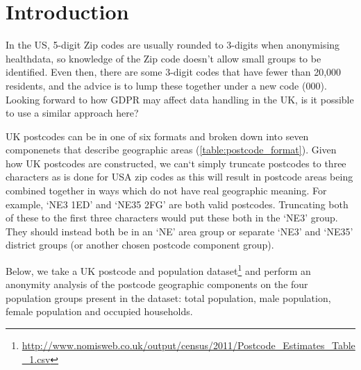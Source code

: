 \documentclass[12pt, a4paper]{article}
\title{\mytitle}
\author{\myauthor}
\date{\mydate}
\begin{document}
\maketitle

\section{Introduction}

In the US, 5-digit Zip codes are usually rounded to 3-digits when anonymising healthdata, so knowledge of the Zip code doesn’t allow small groups to be identified.  Even then, there are some 3-digit codes that have fewer than 20,000 residents, and the advice is to lump these together under a new code (000). Looking forward to how GDPR may affect data handling in the UK, is it possible to use a similar approach here?

UK postcodes can be in one of six formats and broken down into seven componenets that describe geographic areas (\cref{table:postcode_format}). Given how UK postcodes are constructed, we can`t simply truncate postcodes to three characters as is done for USA zip codes as this will result in postcode areas being combined together in ways which do not have real geographic meaning. For example, `NE3 1ED' and `NE35 2FG' are both valid postcodes. Truncating both of these to the first three characters would put these both in the `NE3' group. They should instead both be in an `NE' area group or separate `NE3' and `NE35' district groups (or another chosen postcode component group).

Below, we take a UK postcode and population dataset\footnote{\url{http://www.nomisweb.co.uk/output/census/2011/Postcode_Estimates_Table_1.csv}} and perform an anonymity analysis of the postcode geographic components on the four population groups present in the dataset: total population, male population, female population and occupied households.
\end{document}
